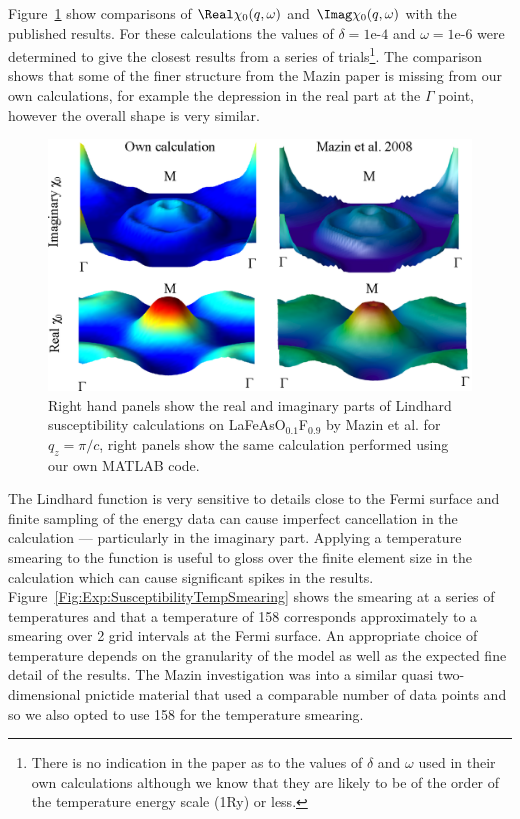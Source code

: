 Figure~\ref{Fig:Exp:MazinX0Comparison} show comparisons of $\Real \chi_0(q,\omega)$ and $\Imag \chi_0(q,\omega)$ with the published results. For these calculations the values of $\delta=\textrm{1e-4}$ and $\omega=\textrm{1e-6}$ were determined to give the closest results from a series of trials\footnote{There is no indication in the paper as to the values of $\delta$ and $\omega$ used in their own calculations although we know that they are likely to be of the order of the temperature energy scale (\unit{1}{\milli Ry}) or less.}. The comparison shows that some of the finer structure from the Mazin paper is missing from our own calculations, for example the depression in the real part at the $\Gamma$ point, however the overall shape is very similar.

\begin{figure}[htbp]
    \begin{center}
        \includegraphics[scale=0.9]{Chapter-ExperimentalTechnique/Figures/Susceptibility/MazinComparison/MazinComparison}
        \caption{Right hand panels show the real and imaginary parts of Lindhard susceptibility calculations on LaFeAsO$_{0.1}$F$_{0.9}$ by Mazin et al. for $q_z=\pi/c$, right panels show the same calculation performed using our own MATLAB code.}
        \label{Fig:Exp:MazinX0Comparison}
    \end{center}
\end{figure}


The Lindhard function is very sensitive to details close to the Fermi surface and finite sampling of the energy data  can cause imperfect cancellation in the calculation --- particularly in the imaginary part. Applying a temperature smearing to the function is useful to gloss over the finite element size in the calculation which can cause significant spikes in the results. Figure~\ref{Fig:Exp:SusceptibilityTempSmearing} shows the smearing at a series of temperatures and that a temperature of \unit{158}{\kelvin} corresponds approximately to a smearing over 2 grid intervals at the Fermi surface. An appropriate choice of temperature depends on the granularity of the model as well as the expected fine detail of the results. The Mazin investigation was into a similar quasi two-dimensional pnictide material that used a comparable number of data points and so we also opted to use \unit{158}{\kelvin} for the temperature smearing.

